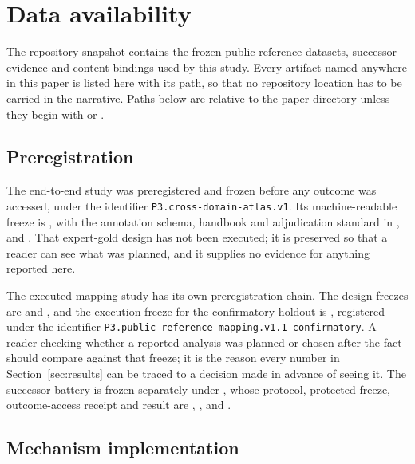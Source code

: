 \section{Data availability}
\label{sec:availability}

The repository snapshot contains the frozen public-reference datasets,
successor evidence and content bindings used by this study. Every
artifact named anywhere in this paper is listed here with its path, so that no
repository location has to be carried in the narrative. Paths below are
relative to the paper directory unless they begin with  or
.

\subsection{Preregistration}

The end-to-end study was preregistered and frozen before any outcome was
accessed, under the identifier \texttt{P3.cross-domain-atlas.v1}. Its
machine-readable freeze is , with the
annotation schema, handbook and adjudication standard in
,
 and
. That expert-gold design has not been
executed; it is preserved so that a reader can see what was planned, and it
supplies no evidence for anything reported here.

The executed mapping study has its own preregistration chain. The design
freezes are  and
, and the execution freeze
for the confirmatory holdout is
, registered
under the identifier \texttt{P3.public-reference-mapping.v1.1-confirmatory}. A
reader checking whether a reported analysis was planned or chosen after the
fact should compare against that freeze; it is the reason every number in
Section~\ref{sec:results} can be traced to a decision made in advance of
seeing it. The successor battery is frozen separately under
, whose protocol, protected freeze,
outcome-access receipt and result are ,
, 
and .

\subsection{Mechanism implementation}

